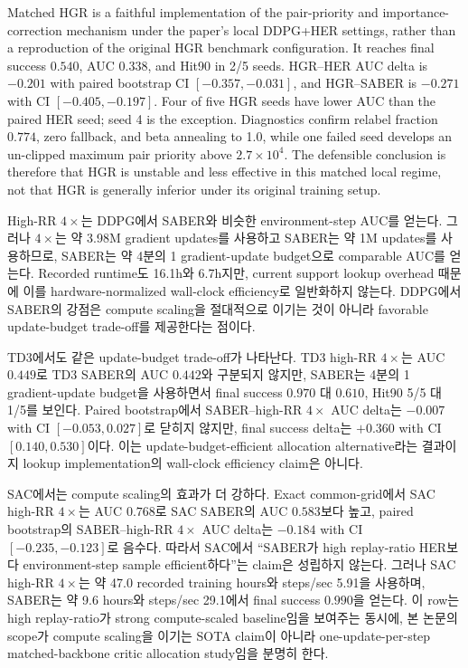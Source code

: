 \documentclass[letterpaper]{article}
\begin{document}
Matched HGR is a faithful implementation of the pair-priority and importance-correction mechanism under the paper's local DDPG+HER settings, rather than a reproduction of the original HGR benchmark configuration. It reaches final success \(0.540\), AUC \(0.338\), and Hit90 in 2/5 seeds. HGR--HER AUC delta is \(-0.201\) with paired bootstrap CI \([-0.357,-0.031]\), and HGR--SABER is \(-0.271\) with CI \([-0.405,-0.197]\). Four of five HGR seeds have lower AUC than the paired HER seed; seed 4 is the exception. Diagnostics confirm relabel fraction \(0.774\), zero fallback, and beta annealing to 1.0, while one failed seed develops an un-clipped maximum pair priority above \(2.7\times10^4\). The defensible conclusion is therefore that HGR is unstable and less effective in this matched local regime, not that HGR is generally inferior under its original training setup.

High-RR \(4\times\)는 DDPG에서 SABER와 비슷한 environment-step AUC를 얻는다. 그러나 \(4\times\)는 약 3.98M gradient updates를 사용하고 SABER는 약 1M updates를 사용하므로, SABER는 약 4분의 1 gradient-update budget으로 comparable AUC를 얻는다. Recorded runtime도 16.1h와 6.7h지만, current support lookup overhead 때문에 이를 hardware-normalized wall-clock efficiency로 일반화하지 않는다. DDPG에서 SABER의 강점은 compute scaling을 절대적으로 이기는 것이 아니라 favorable update-budget trade-off를 제공한다는 점이다.

TD3에서도 같은 update-budget trade-off가 나타난다. TD3 high-RR \(4\times\)는 AUC \(0.449\)로 TD3 SABER의 AUC \(0.442\)와 구분되지 않지만, SABER는 4분의 1 gradient-update budget을 사용하면서 final success \(0.970\) 대 \(0.610\), Hit90 5/5 대 1/5를 보인다. Paired bootstrap에서 SABER--high-RR \(4\times\) AUC delta는 \(-0.007\) with CI \([-0.053,0.027]\)로 닫히지 않지만, final success delta는 \(+0.360\) with CI \([0.140,0.530]\)이다. 이는 update-budget-efficient allocation alternative라는 결과이지 lookup implementation의 wall-clock efficiency claim은 아니다.

SAC에서는 compute scaling의 효과가 더 강하다. Exact common-grid에서 SAC high-RR \(4\times\)는 AUC \(0.768\)로 SAC SABER의 AUC \(0.583\)보다 높고, paired bootstrap의 SABER--high-RR \(4\times\) AUC delta는 \(-0.184\) with CI \([-0.235,-0.123]\)로 음수다. 따라서 SAC에서 ``SABER가 high replay-ratio HER보다 environment-step sample efficient하다''는 claim은 성립하지 않는다. 그러나 SAC high-RR \(4\times\)는 약 47.0 recorded training hours와 steps/sec 5.91을 사용하며, SABER는 약 9.6 hours와 steps/sec 29.1에서 final success \(0.990\)을 얻는다. 이 row는 high replay-ratio가 strong compute-scaled baseline임을 보여주는 동시에, 본 논문의 scope가 compute scaling을 이기는 SOTA claim이 아니라 one-update-per-step matched-backbone critic allocation study임을 분명히 한다.
\end{document}
